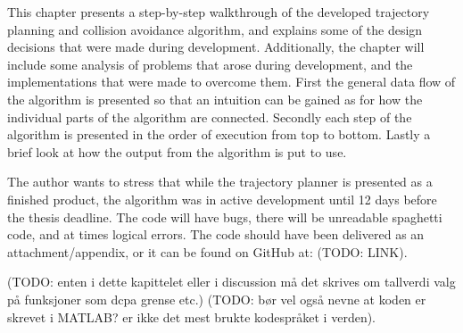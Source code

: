 


This chapter presents a step-by-step walkthrough of the developed trajectory planning and collision avoidance algorithm, and explains some of the
design decisions that were made during development. Additionally, the chapter will include some analysis of problems that arose during development,
and the implementations that were made to overcome them. First the general data flow of the algorithm is presented so that an intuition
can be gained as for how the individual parts of the algorithm are connected. Secondly each step of the algorithm is presented in the order of execution
from top to bottom. Lastly a brief look at how the output from the algorithm is put to use. 

The author wants to stress that while the trajectory planner is presented as a finished product, the algorithm was in active development until 12 days before
the thesis deadline. The code will have bugs, there will be unreadable spaghetti code, and at times logical errors. The code should have been delivered
as an attachment/appendix, or it can be found on GitHub at: (TODO: LINK).

(TODO: enten i dette kapittelet eller i discussion må det skrives om tallverdi valg på funksjoner som dcpa grense etc.)
(TODO: bør vel også nevne at koden er skrevet i MATLAB? er ikke det mest brukte kodespråket i verden).

